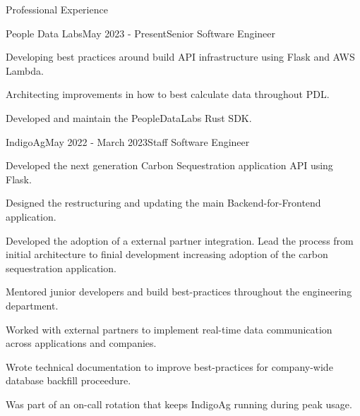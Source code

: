 \documentclass{bluefin_cv}
\begin{document}
\begin{bfcvSection}{Professional Experience}

\begin{bfcvWorkSubsection}{People Data Labs}{May 2023 - Present}{Senior Software Engineer}
\item Developing best practices around build API infrastructure using Flask and AWS Lambda.
\item Architecting improvements in how to best calculate data throughout PDL.
\item Developed and maintain the PeopleDataLabs Rust SDK.
\end{bfcvWorkSubsection}

\begin{bfcvWorkSubsection}{IndigoAg}{May 2022 - March 2023}{Staff Software Engineer}
\item Developed the next generation Carbon Sequestration application API using Flask.
\item Designed the restructuring and updating the main Backend-for-Frontend application.
\item Developed the adoption of a external partner integration. Lead the process from initial architecture to finial development increasing adoption of the carbon sequestration application.
\item Mentored junior developers and build best-practices throughout the engineering department.
\item Worked with external partners to implement real-time data communication across applications and companies.
\item Wrote technical documentation to improve best-practices for company-wide database backfill proceedure.
\item Was part of an on-call rotation that keeps IndigoAg running during peak usage.
\end{bfcvWorkSubsection}


\end{bfcvSection}
\end{document}
